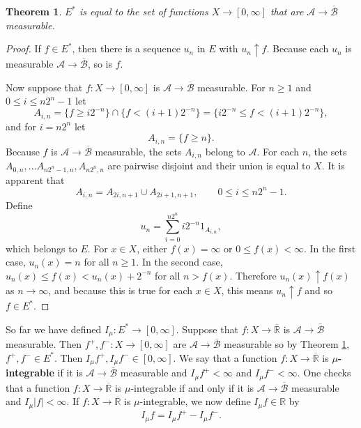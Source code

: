 \documentclass{article}
\newtheorem{theorem}{Theorem}
\theoremstyle{definition}
\begin{document}
\begin{theorem}
$E^*$ is equal to the set of   functions $X \to [0,\infty]$ that are $\mathscr{A} \to \overline{\mathscr{B}}$ measurable.
\label{Estar}
\end{theorem}
\begin{proof}
If $f \in E^*$, then  there is a sequence $u_n$ in $E$ with $u_n \uparrow f$. Because each $u_n$ is measurable $\mathscr{A} \to \overline{\mathscr{B}}$,
so is $f$.

Now suppose that $f:X \to [0,\infty]$ is  $\mathscr{A} \to \overline{\mathscr{B}}$ measurable.
For $n \geq 1$ and $0 \leq i \leq n2^n-1$ let
\[
A_{i,n} = \{f \geq i2^{-n}\} \cap \{f<(i+1)2^{-n}\} = \{i2^{-n} \leq f < (i+1)2^{-n}\},
\]
and for $i=n2^n$ let
\[
A_{i,n} = \{f \geq n\}.
\]
Because $f$ is $\mathscr{A} \to \overline{\mathscr{B}}$ measurable, the sets $A_{i,n}$ belong to $\mathscr{A}$. For each
$n$, the sets $A_{0,n},\ldots A_{n2^n-1,n},A_{n2^n,n}$ are pairwise disjoint and their union is equal to $X$. 
It is apparent that
\begin{equation}
A_{i,n} = A_{2i,n+1} \cup A_{2i+1,n+1},\qquad 0 \leq i \leq n2^n-1.
\label{A2i}
\end{equation}
Define
\[
u_n = \sum_{i=0}^{n2^n} i2^{-n} 1_{A_{i,n}},
\]
which belongs to $E$. For $x \in X$, either $f(x)=\infty$ or $0 \leq f(x) < \infty$. In the first case,
$u_n(x)=n$ for all $n \geq 1$. In the second case,
$u_n(x) \leq f(x) < u_n(x)+2^{-n}$ for all $n>f(x)$. Therefore
$u_n(x) \uparrow f(x)$ as $n \to \infty$, and because this is true for each $x \in X$, this means
$u_n \uparrow f$ and so $f \in E^*$.
\end{proof}


So far we have defined $I_\mu:E^* \to [0,\infty]$. 
Suppose that $f:X \to \overline{\mathbb{R}}$ is $\mathscr{A} \to \overline{\mathscr{B}}$
measurable.
Then $f^+,f^-:X \to [0,\infty]$ are  $\mathscr{A} \to \overline{\mathscr{B}}$
measurable so by Theorem \ref{Estar}, 
$f^+,f^- \in E^*$. Then  
$I_\mu f^+, I_\mu f^- \in [0,\infty]$.
We say that a function $f:X \to \overline{\mathbb{R}}$ is \textbf{$\mu$-integrable} if it is $\mathscr{A} \to \overline{\mathscr{B}}$
measurable and 
$I_\mu f^+<\infty$ and $I_\mu f^-<\infty$. 
One checks that a function $f:X \to \overline{\mathbb{R}}$ is $\mu$-integrable if and only if it
is $\mathscr{A} \to \overline{\mathscr{B}}$ measurable and $I_\mu |f| < \infty$.
If $f:X \to \overline{\mathbb{R}}$ is $\mu$-integrable, we now define $I_\mu f \in \mathbb{R}$ by
\[
I_\mu f = I_\mu f^+ - I_\mu f^-.
\]
\end{document}
